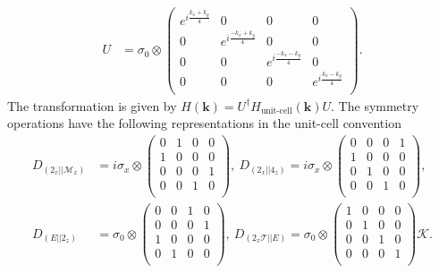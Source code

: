\documentclass[aps,preprintnumbers,amsmath,amssymb]{revtex4-2}
\begin{document}
\begin{align}
    U &= \sigma_0 \otimes \begin{pmatrix}
    e^{i \tfrac{k_x + k_y}{4}}&0&0&0\\
    0&e^{i\tfrac{-k_x+k_y}{4}}&0&0\\
    0&0&e^{i\tfrac{-k_x-k_y}{4}}&0\\
    0&0&0&e^{i\tfrac{k_x-k_y}{4}}\\
    \end{pmatrix} .
\end{align}
The transformation is given by $H(\mathbf{k}) = U^{\dagger} H_{\text{unit-cell}}(\mathbf{k})U$.
The symmetry operations have the following representations in the unit-cell convention
\begin{align}
    D_{(2_x||\mathcal{M}_x)} &= i\sigma_x \otimes \begin{pmatrix}
    0&1&0&0\\
    1&0&0&0\\
    0&0&0&1\\
    0&0&1&0\\
    \end{pmatrix}, \  D_{(2_x||4_z)} = i\sigma_x \otimes 
    \begin{pmatrix}
    0&0&0&1\\
    1&0&0&0\\
    0&1&0&0\\
    0&0&1&0\\
    \end{pmatrix},\\
    D_{(E||2_z)} &= \sigma_0 \otimes \begin{pmatrix}
    0&0&1&0\\
    0&0&0&1\\
    1&0&0&0\\
    0&1&0&0\\
    \end{pmatrix},\ D_{(2_x\mathcal{T}||E)} = \sigma_0 \otimes \begin{pmatrix}
    1&0&0&0\\
    0&1&0&0\\
    0&0&1&0\\
    0&0&0&1\\
    \end{pmatrix} \mathcal{K}.
\end{align}
\end{document}
